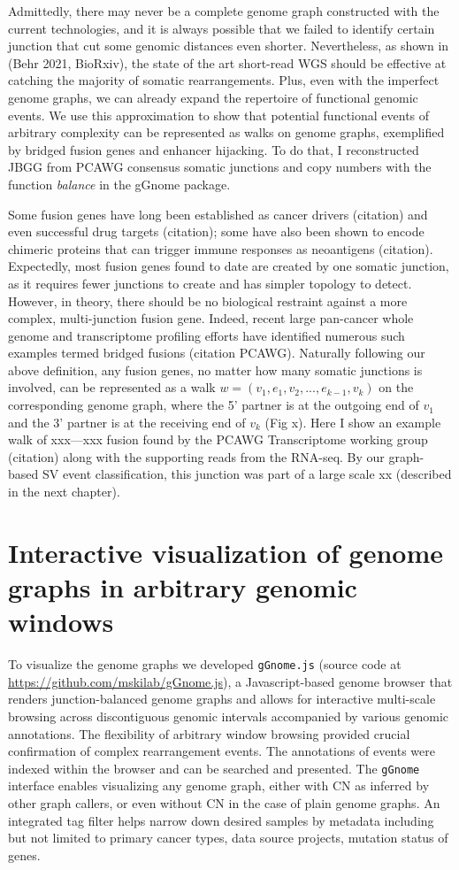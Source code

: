 \documentclass[phd,tocprelim]{cornell}
\begin{document}
Admittedly, there may never be a complete genome graph constructed with the current technologies, and it is always possible that we failed to identify certain junction that cut some genomic distances even shorter. Nevertheless, as shown in (Behr 2021, BioRxiv), the state of the art short-read WGS should be effective at catching the majority of somatic rearrangements. Plus, even with the imperfect genome graphs, we can already expand the repertoire of functional genomic events. We use this approximation to show that potential functional events of arbitrary complexity can be represented as walks on genome graphs, exemplified by bridged fusion genes and enhancer hijacking. To do that, I reconstructed JBGG from PCAWG consensus somatic junctions and copy numbers with the function \textit{balance} in the gGnome package.

Some fusion genes have long been established as cancer drivers (citation) and even successful drug targets (citation); some have also been shown to encode chimeric proteins that can trigger immune responses as neoantigens (citation). Expectedly, most fusion genes found to date are created by one somatic junction, as it requires fewer junctions to create and has simpler topology to detect. However, in theory, there should be no biological restraint against a more complex, multi-junction fusion gene. Indeed, recent large pan-cancer whole genome and transcriptome profiling efforts have identified numerous such examples termed bridged fusions (citation PCAWG). Naturally following our above definition, any fusion genes, no matter how many somatic junctions is involved, can be represented as a walk $w = (v_1, e_1, v_2, ..., e_{k-1}, v_k)$ on the corresponding genome graph, where the 5’ partner is at the outgoing end of $v_1$ and the 3’ partner is at the receiving end of $v_k$ (Fig x). Here I show an example walk of xxx—xxx fusion found by the PCAWG Transcriptome working group (citation) along with the supporting reads from the RNA-seq. By our graph-based SV event classification, this junction was part of a large scale xx (described in the next chapter).

\section{Interactive visualization of genome graphs in arbitrary genomic windows}
To visualize the genome graphs we developed \texttt{gGnome.js} (source code at \url{https://github.com/mskilab/gGnome.js}), a Javascript-based genome browser that renders junction-balanced genome graphs and allows for interactive multi-scale browsing across discontiguous genomic intervals accompanied by various genomic annotations. The flexibility of arbitrary window browsing provided crucial confirmation of complex rearrangement events. The annotations of events were indexed within the browser and can be searched and presented. The \texttt{gGnome} interface enables visualizing any genome graph, either with CN as inferred by other graph callers, or even without CN in the case of plain genome graphs. An integrated tag filter helps narrow down desired samples by metadata including but not limited to primary cancer types, data source projects, mutation status of genes.
\end{document}
